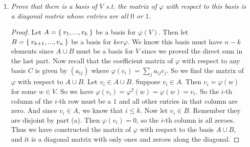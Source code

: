 \documentclass[10pt,oneside,reqno]{amsart}
\theoremstyle{plain}
\theoremstyle{definition}
\theoremstyle{remark}
\renewcommand{\phi}{\varphi}
\begin{document}
\begin{enumerate}[label=\arabic*.]
\begin{enumerate}
\item \textit{Prove that there is a basis of $V$ s.t. the matrix of $\phi$ with respect to this basis is a diagonal matrix whose entries are all $0$ or $1$. }

\begin{proof}
Let $A = \Set{v_1,...,v_k}$ be a basis for $\phi(V)$. Then let $B = \Set{v_{k + 1},...,v_n}$ be a basis for $ker\phi$. We know this basis must have $n - k$ elements since $A \cup B$ must be a basis for $V$ since we proved the direct sum in the last part. Now recall that the coefficient matrix of $\phi$ with respect to any basis $C$ is given by $(a_{ij})$ where $\phi(c_i) = \sum_j a_{ij}c_j$. So we find the matrix of $\phi$ with respect to $A \cup B$. Let $v_i \in A \cup B$. Suppose $v_i \in A$. Then $v_i = \phi(w)$ for some $w \in V$. So we have $\phi(v_i) = \phi^2(w) = \phi(w) = v_i$. So the $i$-th column of the $i$-th row must be a $1$ and all other entries in that column are zero. And since $v_i \in A$, we know that $i \leq k$. Now let $v_i \in B$. Remember they are disjoint by part (a). Then $\phi(v_i) = 0$, so the $i$-th column is all zeroes. Thus we have constructed the matrix of $\phi$ with respect to the basis $A \cup B$, and it is a diagonal matrix with only ones and zeroes along the diagonal.  
\end{proof}
\end{enumerate}

\end{enumerate}
\end{document}
